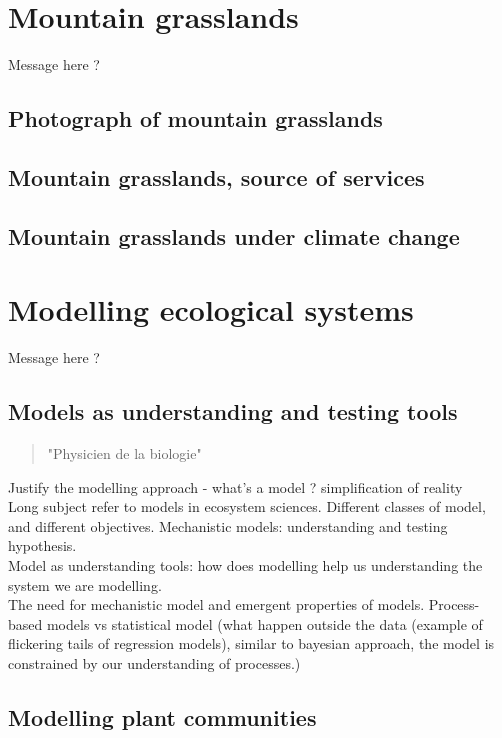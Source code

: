 

\chapter{Mountain grasslands}
Message here ?
\section{Photograph of mountain grasslands}

\section{Mountain grasslands, source of services}

\section{Mountain grasslands under climate change}

\chapter{Modelling ecological systems}
Message here ?
\section{Models as understanding and testing tools}

\begin{quote}
"Physicien de la biologie"
\end{quote}
Justify the modelling approach - what's a model ? simplification of reality\\
Long subject refer to models in ecosystem sciences. Different classes of model, and different objectives. Mechanistic models: understanding and testing hypothesis.\\
Model as understanding tools: how does modelling help us understanding the system we are modelling.\\
The need for mechanistic model and emergent properties of models. Process-based models vs statistical model (what happen outside the data (example of flickering tails of regression models), similar to bayesian approach, the model is constrained by our understanding of processes.) \\

\section{Modelling plant communities}

